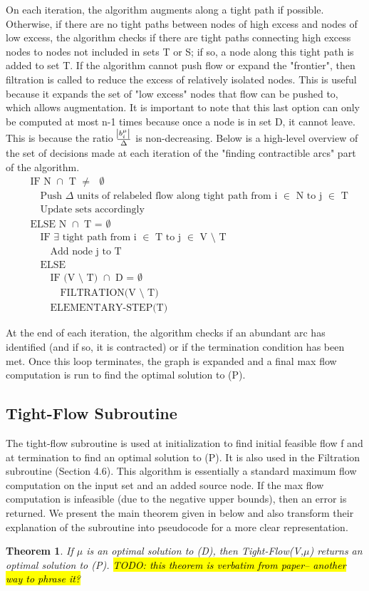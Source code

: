 \documentclass[11pt]{article}
\newtheorem{theorem}{Theorem}[section]
\theoremstyle{definition}
\theoremstyle{definition}
\newcommand{\todo}[1]{\hl{TODO: #1}}
\begin{document}
On each iteration, the algorithm augments along a tight path if possible. Otherwise, if there are no tight paths between nodes of high excess and nodes of low excess, the algorithm checks if there are tight paths connecting high excess nodes to nodes not included in sets T or S; if so, a node along this tight path is added to set T. If the algorithm cannot push flow or expand the "frontier", then filtration is called to reduce the excess of relatively isolated nodes. This is useful because it expands the set of "low excess" nodes that flow can be pushed to, which allows augmentation. It is important to note that this last option can only be computed at most n-1 times because once a node is in set D, it cannot leave. This is because the ratio $\frac{\abs{b_i^\mu}}{\Delta}$ is non-decreasing. Below is a high-level overview of the set of decisions made at each iteration of the "finding contractible arcs" part of the algorithm.
\begin{align*}
&\text{IF N $\cap$ T $\neq$ $\emptyset$} \\
&\quad \text{Push $\Delta$ units of relabeled flow along tight path from i $\in$ N to j $\in$ T} \\ 
&\quad \text{Update sets accordingly} \\
&\text{ELSE N $\cap$ T = $\emptyset$} \\
&\quad \text{IF $\exists$ tight path from i $\in$ T to j $\in$ V $\setminus$ T} \\
&\quad \quad \text{Add node j to T} \\
&\quad \text{ELSE} \\
&\quad \quad \text{IF (V $\setminus$ T) $\cap$ D = $\emptyset$} \\
&\quad \quad \quad \text{FILTRATION(V $\setminus$ T)} \\
&\quad \quad \text{ELEMENTARY-STEP(T)} 
\end{align*}

At the end of each iteration, the algorithm checks if an abundant arc has identified (and if so, it is contracted) or if the termination condition has been met. Once this loop terminates, the graph is expanded and a final max flow computation is run to find the optimal solution to (P).
\subsection{Tight-Flow Subroutine}
The tight-flow subroutine is used at initialization to find initial feasible flow f and at termination to find an optimal solution to (P). It is also used in the Filtration subroutine (Section 4.6). This algorithm is essentially a standard maximum flow computation on the input set and an added source node. If the max flow computation is infeasible (due to the negative upper bounds), then an error is returned. We present the main theorem given in \cite{Vegh2013} below and also transform their explanation of the subroutine into pseudocode for a more clear representation.
\begin{theorem}
If $\mu$ is an optimal solution to (D), then Tight-Flow(V,$\mu$) returns an optimal solution to (P). \todo{this theorem is verbatim from paper-- another way to phrase it?}
\end{theorem}
\end{document}
